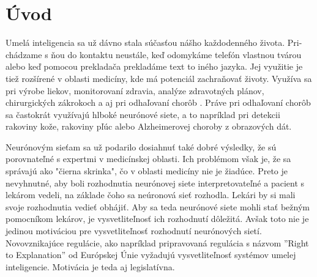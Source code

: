 \chapter{Úvod}


Umelá inteligencia sa už dávno stala súčasťou nášho každodenného života. Pri-chádzame s ňou do kontaktu neustále, keď odomykáme telefón vlastnou tvárou alebo keď pomocou prekladača prekladáme text to iného jazyka. 
Jej využitie je tiež rozšírené v oblasti medicíny, kde má potenciál zachraňovať životy. Využíva sa pri výrobe liekov, monitorovaní zdravia, analýze zdravotných plánov, chirurgických zákrokoch a aj pri odhaľovaní chorôb \cite{amisha2019overview}.
Práve pri odhaľovaní chorôb sa častokrát využívajú hlboké neurónové siete, a to napríklad pri detekcii rakoviny kože, rakoviny pľúc alebo Alzheimerovej choroby z obrazových dát.

Neurónovým sieťam sa už podarilo dosiahnuť také dobré výsledky, že sú porovnateľné s expertmi v medicínskej oblasti.
Ich problémom však je, že sa správajú ako "čierna skrinka", čo v oblasti medicíny nie je žiadúce. Preto je nevyhnutné, aby boli rozhodnutia neurónovej siete interpretovateľné a pacient s lekárom vedeli, na základe čoho sa neúronová sieť rozhodla. Lekári by si mali svoje rozhodnutia vedieť obhájiť. Aby sa teda neurónové siete mohli stať bežným pomocníkom lekárov, je vysvetliteľnosť ich rozhodnutí dôležitá. Avšak toto nie je jedinou motiváciou pre vysvetliteľnosť rozhodnutí neurónových sietí. Novovznikajúce regulácie, ako napríklad pripravovaná regulácia s názvom ''Right to Explanation'' od Európskej Únie \cite{gilpin2018explaining} vyžadujú vysvetliteľnosť systémov umelej inteligencie. Motivácia je teda aj legislatívna.

